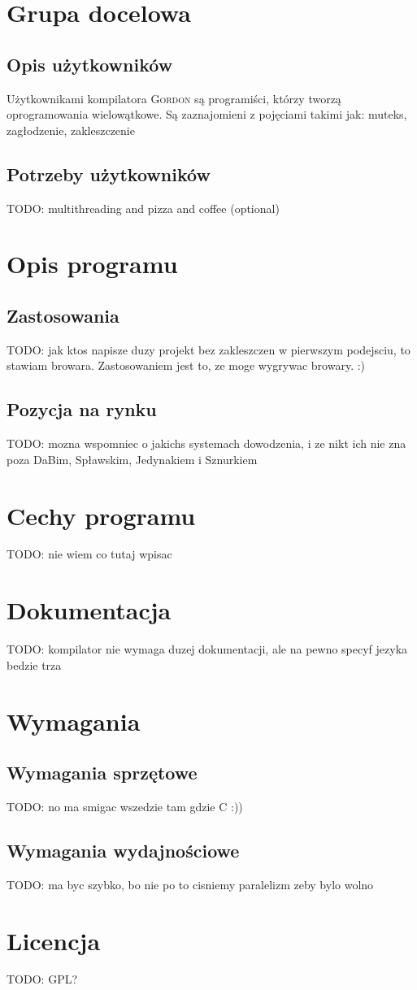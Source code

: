 \documentclass{documentation}
\begin{document}
\section{Grupa docelowa}
\subsection{Opis użytkowników}
Użytkownikami kompilatora \textsc{Gordon} są programiści, którzy tworzą oprogramowania wielowątkowe. Są zaznajomieni z pojęciami takimi jak: muteks, zagłodzenie, zakleszczenie 
\subsection{Potrzeby użytkowników}
TODO: multithreading and pizza and coffee (optional)

\section{Opis programu}
\subsection{Zastosowania}
TODO: jak ktos napisze duzy projekt bez zakleszczen w pierwszym podejsciu, to stawiam browara. Zastosowaniem jest to, ze moge wygrywac browary. :)
\subsection{Pozycja na rynku}
TODO: mozna wspomniec o jakichs systemach dowodzenia, i ze nikt ich nie zna poza DaBim, Spławskim, Jedynakiem i Sznurkiem

\section{Cechy programu}
TODO: nie wiem co tutaj wpisac

\section{Dokumentacja}
TODO: kompilator nie wymaga duzej dokumentacji, ale na pewno specyf jezyka bedzie trza

\section{Wymagania}
\subsection{Wymagania sprzętowe}
TODO: no ma smigac wszedzie tam gdzie C :))

\subsection{Wymagania wydajnościowe}
TODO: ma byc szybko, bo nie po to cisniemy paralelizm zeby bylo wolno

\section{Licencja}
TODO: GPL?
\end{document}
